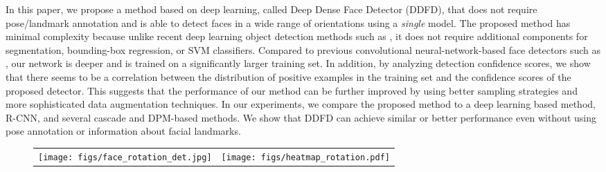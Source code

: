 \documentclass{sig-alternate-2013}
\begin{document}
In this paper, we propose a method based on deep learning, called Deep Dense Face Detector (DDFD), that does not require pose/landmark annotation and is able to detect faces in  a wide range of orientations using a \textit{single} model. The proposed method has minimal complexity because unlike recent deep learning object detection methods such as \cite{rcnn}, it does not require additional components for segmentation, bounding-box regression, or SVM classifiers. Compared to previous convolutional neural-network-based face detectors such as \cite{Garcia04}, our network is deeper and is trained on a significantly larger training set. 
In addition, by analyzing detection confidence scores, we show that there seems to be a correlation between the distribution of positive examples in the training set and the confidence scores of the proposed detector. This suggests that the performance of our method can be further improved by using better sampling strategies and more sophisticated data augmentation techniques. In our experiments, we compare the proposed method to a deep learning based method, R-CNN, and several cascade and DPM-based methods. We show that DDFD can achieve similar or better performance even without using pose annotation or information about facial landmarks.



\begin{figure*}[t]
  \centering
	\begin{tabular}{cc}
        \texttt{[image: figs/face\_rotation\_det.jpg]} &
        \texttt{[image: figs/heatmap\_rotation.pdf]}
    \end{tabular}
  \caption{}
  \label{fig:heat_map}
\end{figure*}
\end{document}
